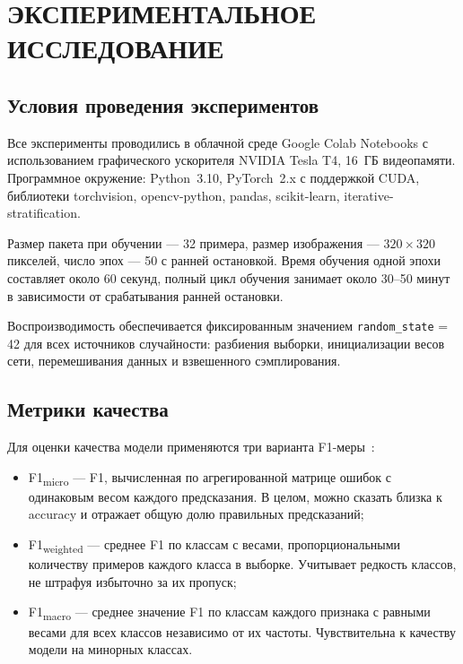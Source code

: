 \section{ЭКСПЕРИМЕНТАЛЬНОЕ ИССЛЕДОВАНИЕ}

\subsection{Условия проведения экспериментов}

Все эксперименты проводились в облачной среде Google Colab Notebooks с использованием графического ускорителя NVIDIA Tesla T4, 16~ГБ видеопамяти. Программное окружение: Python~3.10, PyTorch~2.x с поддержкой CUDA, библиотеки torchvision, opencv-python, pandas, scikit-learn, iterative-stratification.

Размер пакета при обучении --- 32 примера, размер изображения --- $320 \times 320$ пикселей, число эпох --- 50 с ранней остановкой. Время обучения одной эпохи составляет около 60 секунд, полный цикл обучения занимает около 30--50 минут в зависимости от срабатывания ранней остановки.

Воспроизводимость обеспечивается фиксированным значением \texttt{random\_state} = 42 для всех источников случайности: разбиения выборки, инициализации весов сети, перемешивания данных и взвешенного сэмплирования.

\subsection{Метрики качества}

Для оценки качества модели применяются три варианта F1-меры~\cite{f1-score}:

\begin{itemize}
    \item F1\textsubscript{micro} --- F1, вычисленная по агрегированной матрице ошибок с одинаковым весом каждого предсказания. В целом, можно сказать близка к accuracy и отражает общую долю правильных предсказаний;
    \item F1\textsubscript{weighted} --- среднее F1 по классам с весами, пропорциональными количеству примеров каждого класса в выборке. Учитывает редкость классов, не штрафуя избыточно за их пропуск;
    \item F1\textsubscript{macro} --- среднее значение F1 по классам каждого признака с равными весами для всех классов независимо от их частоты. Чувствительна к качеству модели на минорных классах.
\end{itemize}

